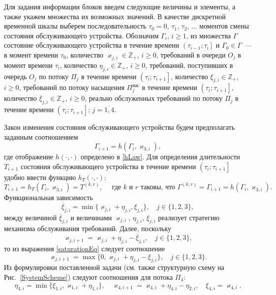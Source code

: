 \documentclass[a4paper,twoside]{article}
\theoremstyle{theorem}
\theoremstyle{remark}
\begin{document}
Для задания информации блоков введем следующие величины и элементы, а также укажем множества их возможных значений. В качестве дискретной временной шкалы выберем последовательность $\tau_0=0$, $\tau_1$, $\tau_2$, $\ldots$ моментов смены состояния обслуживающего устройства. Обозначим $\Gamma_i$, $i\geqslant 1$, из множества $\Gamma$ состояние обслуживающего устройства в течение времени $\left(\tau_{i-1};\tau_i\right]$ и $\Gamma_0\in \Gamma$~--- в момент времени $\tau_0$, количество $\varkappa_{j,i} \in \mathbb{Z}_+ $, $i\geqslant 0$, требований в очереди $O_j$ в момент времени $\tau_i$, количество $\eta_{j,i} \in \mathbb{Z}_+$, $i\geqslant 0$, требований, поступивших в очередь $O_j$ по потоку $\Pi_j$ в течение времени $\left(\tau_{i};\tau_{i+1}\right]$, количество $\xi_{j,i} \in \mathbb{Z}_+$, $i\geqslant 0$, требований по потоку насыщения $\Pi^{\mathrm{\text{нас}}}_j$ в течение времени $\left(\tau_{i};\tau_{i+1}\right]$, количество $\overline{\xi}_{j,i}\in \mathbb{Z}_+$, $i\geqslant 0$, реально обслуженных требований по потоку $\Pi_j$ в течение времени $\left(\tau_{i};\tau_{i+1}\right]$; $j=\overline{1,4}$.

Закон изменения состояния обслуживающего устройства будем предполагать заданным соотношением 
\begin{equation}
\Gamma_{i+1}=h(\Gamma_i,\varkappa_{3,i}),
\label{gammaFunc}
\end{equation}
где отображение $h(\cdot,\cdot)$ определено в \eqref{hLaw}.
Для определения длительности $T_{i+1}$ состояния обслуживающего устройства в течение времени $\left(\tau_{i};\tau_{i+1}\right]$ удобно ввести функцию $h_T(\cdot,\cdot)$:
\begin{equation*}
T_{i+1}=h_T(\Gamma_i,\varkappa_{3,i})= T^{(k,r)},\quad  \text{ где $k$ и $r$ таковы, что } \Gamma^{(k,r)}=\Gamma_{i+1}=h(\Gamma_i,\varkappa_{3,i}).
\end{equation*}
Функциональная зависимость
\begin{equation}
\overline{\xi}_{j,i}=\min\{\varkappa_{j,i}+\eta_{j,i},\xi_{j,i}\}, \quad j\in \{1,2,3\},
\label{saturationEq}
\end{equation}
между величиной $\overline{\xi}_{j,i}$ и величинами $\varkappa_{j,i}$, $\eta_{j,i}$, $\xi_{j,i}$ реализует стратегию механизма обслуживания требований. Далее, поскольку 
\begin{equation*}
\varkappa_{j,i+1}=\varkappa_{j,i}+\eta_{j,i}-\overline{\xi}_{j,i}, \quad  j\in \{1,2,3\},
\end{equation*}
то из выражения \eqref{saturationEq} следует соотношение
\begin{equation}
\varkappa_{j,i+1}=\max\{{0,\varkappa_{j,i}+\eta_{j,i}-\xi_{j,i}}\}, \quad j\in \{1,2,3\}.
\label{queuesFunc}
\end{equation}
Из формулировки поставленной задачи (см. также структурную схему на Рис.~\ref{SystemScheme}) следуют соотношения для потока $\Pi_4$:
\begin{equation}
\eta_{4,i} = \min\{\xi_{1,i}, \varkappa_{1,i}+\eta_{1,i}\}, \quad \varkappa_{4,i+1}=\varkappa_{4,i}+\eta_{4,i}-\eta_{2,i}, \quad \xi_{4,i} = \varkappa_{4,i}.
\label{FourthFunc}
\end{equation}
\end{document}
